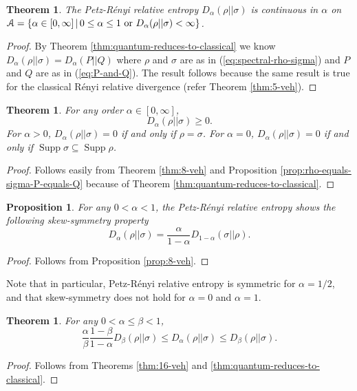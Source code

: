 \documentclass[12pt,a4paper,oneside]{article}
\numberwithin{equation}{section}
\theoremstyle{definition}  %
\theoremstyle{plain}  %
\newtheorem{thm}[defn]{Theorem}
\newtheorem{prop}[defn]{Proposition}
\theoremstyle{remark} %
\DeclareMathOperator{\supp}{Supp}
\begin{document}
\begin{thm}
 \label{thm:7-veh-quantum}
The Petz-R\'enyi relative entropy $D_\alpha (\rho||\sigma)$ is continuous in $\alpha$ on $\mathcal{A} = \{\alpha\in [0,\infty]\,|\, 0\leq \alpha\leq 1\textnormal{ or } D_{\alpha}(\rho||\sigma)<\infty\}$.
\end{thm}
\begin{proof} By Theorem \ref{thm:quantum-reduces-to-classical} we know $D_\alpha (\rho||\sigma) = D_\alpha (P||Q)$ where $\rho$ and $\sigma$ are as in (\ref{eq:spectral-rho-sigma})  and $P$ and $Q$ are as in (\ref{eq:P-and-Q}). The result follows because the same result is true for the classical R\'enyi relative divergence (refer Theorem \ref{thm:5-veh}).
\end{proof}
\begin{thm}
\label{thm:8-veh-quantum} For any order $\alpha\in [0,\infty]$, 
\[D_{\alpha}(\rho||\sigma)\geq 0.\] For $\alpha>0$, $D_{\alpha}(\rho||\sigma) = 0$ if and only if $\rho=\sigma$. For $\alpha = 0$, $D_{\alpha}(\rho||\sigma) = 0$ if and only if $\supp \sigma \subseteq \supp \rho$.
\end{thm}
\begin{proof}
Follows easily from Theorem \ref{thm:8-veh} and Proposition \ref{prop:rho-equals-sigma-P-equals-Q} because of Theorem \ref{thm:quantum-reduces-to-classical}.
\end{proof}
\begin{prop}
\label{prop:8-veh-quantum}
For any $0<\alpha<1$, the Petz-R\'enyi relative entropy shows the following skew-symmetry property \[D_\alpha(\rho||\sigma) = \frac{\alpha}{1-\alpha}D_{1-\alpha}(\sigma||\rho).\]
\end{prop}
\begin{proof}
Follows from Proposition \ref{prop:8-veh}.
\end{proof}
Note that in particular, Petz-R\'enyi relative entropy is symmetric for $\alpha=1/2$, and that skew-symmetry does not hold for $\alpha = 0$ and $\alpha = 1$. 
\begin{thm}
\label{thm:16-veh-quantum}
For any $0<\alpha\leq \beta <1$,\[\frac{\alpha}{\beta}\frac{1-\beta}{1-\alpha}D_{\beta}(\rho||\sigma)\leq D_\alpha (\rho||\sigma)\leq D_{\beta}(\rho||\sigma).\]
\end{thm}
\begin{proof}
Follows from Theorems \ref{thm:16-veh} and \ref{thm:quantum-reduces-to-classical}.
\end{proof}
\end{document}
